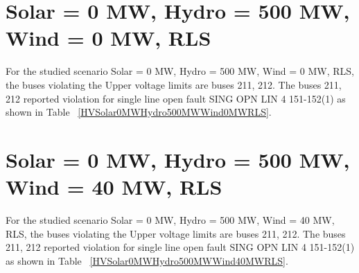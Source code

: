 \documentclass[10pt]{report}
\begin{document}
\section{Solar = 0 MW, Hydro = 500 MW, Wind = 0 MW, RLS}
For the studied scenario Solar = 0 MW, Hydro = 500 MW, Wind = 0 MW, RLS, the buses violating the Upper voltage limits are buses 211, 212.
The buses 211, 212 reported violation for single line open fault SING OPN LIN   4 151-152(1) as shown in Table ~\ref{HVSolar0MWHydro500MWWind0MWRLS}.
\begin{table}[H]
\caption{Contingencies reporting bus voltages greater than emergency voltage of 1.1 PU for scenario Solar = 0 MW, Hydro = 500 MW, Wind = 0 MW, RLS}
\label{HVSolar0MWHydro500MWWind0MWRLS}
\centering
{}
\end{table}


\section{Solar = 0 MW, Hydro = 500 MW, Wind = 40 MW, RLS}
For the studied scenario Solar = 0 MW, Hydro = 500 MW, Wind = 40 MW, RLS, the buses violating the Upper voltage limits are buses 211, 212.
The buses 211, 212 reported violation for single line open fault SING OPN LIN   4 151-152(1) as shown in Table ~\ref{HVSolar0MWHydro500MWWind40MWRLS}.
\begin{table}[H]
\caption{Contingencies reporting bus voltages greater than emergency voltage of 1.1 PU for scenario Solar = 0 MW, Hydro = 500 MW, Wind = 40 MW, RLS}
\label{HVSolar0MWHydro500MWWind40MWRLS}
\centering
{}
\end{table}
\end{document}
